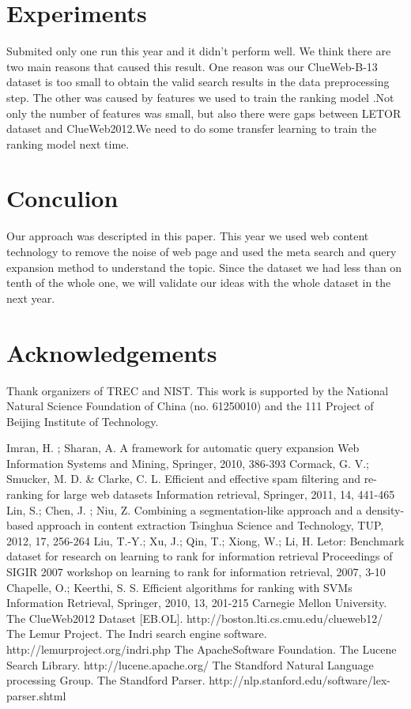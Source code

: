 \documentclass[runningheads,a4paper]{llncs}
\begin{document}
\section{Experiments}

Submited only one run this year and it didn't perform well. We think there are two main reasons that caused this result. One reason was our ClueWeb-B-13 dataset is too small to obtain the valid search results in the data preprocessing step. The other  was caused by features we used to train the ranking model .Not only the number of features was small, but also there were gaps between LETOR dataset and ClueWeb2012.We need to do some transfer learning  to train the ranking model next time.

\section{Conculion}

Our approach was descripted in this paper. This year we used web content technology to remove the noise of web page and used the meta search and query expansion method to understand the topic. Since the dataset we had less than on tenth of the whole one, we will validate our ideas with the whole dataset in the next year.

\section{Acknowledgements}

Thank organizers of TREC and NIST. This work is supported by the National Natural Science Foundation of China (no. 61250010) and  the 111 Project of Beijing Institute of Technology.


\begin{thebibliography}{4}
Imran, H. ; Sharan, A. A framework for automatic query expansion Web Information Systems and Mining, Springer, 2010, 386-393
Cormack, G. V.; Smucker, M. D. \& Clarke, C. L. Efficient and effective spam filtering and re-ranking for large web datasets Information retrieval, Springer, 2011, 14, 441-465
Lin, S.; Chen, J. ; Niu, Z. Combining a segmentation-like approach and a density-based approach in content extraction Tsinghua Science and Technology, TUP, 2012, 17, 256-264
Liu, T.-Y.; Xu, J.; Qin, T.; Xiong, W.; Li, H. Letor: Benchmark dataset for research on learning to rank for information retrieval Proceedings of SIGIR 2007 workshop on learning to rank for information retrieval, 2007, 3-10
Chapelle, O.; Keerthi, S. S. Efficient algorithms for ranking with SVMs Information Retrieval, Springer, 2010, 13, 201-215
 Carnegie Mellon University. The ClueWeb2012 Dataset [EB.OL]. http://boston.lti.cs.cmu.edu/clueweb12/
 The Lemur Project. The Indri search engine software. http://lemurproject.org/indri.php
 The ApacheSoftware Foundation. The Lucene Search Library. http://lucene.apache.org/
 The Standford Natural Language processing Group. The Standford Parser. http://nlp.stanford.edu/software/lex-parser.shtml
\end{thebibliography}
\end{document}
